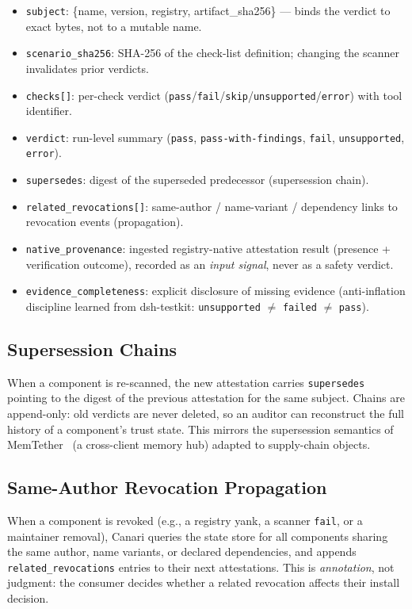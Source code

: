 \documentclass[11pt,a4paper]{article}
\begin{document}
\begin{itemize}[leftmargin=1.5em]
\item \texttt{subject}: \{name, version, registry, artifact\_sha256\} --- binds the
verdict to exact bytes, not to a mutable name.
\item \texttt{scenario\_sha256}: SHA-256 of the check-list definition; changing
the scanner invalidates prior verdicts.
\item \texttt{checks[]}: per-check verdict (\texttt{pass}/\texttt{fail}/\texttt{skip}/\texttt{unsupported}/\texttt{error}) with tool identifier.
\item \texttt{verdict}: run-level summary (\texttt{pass},
\texttt{pass-with-findings}, \texttt{fail}, \texttt{unsupported}, \texttt{error}).
\item \texttt{supersedes}: digest of the superseded predecessor (supersession chain).
\item \texttt{related\_revocations[]}: same-author / name-variant / dependency
links to revocation events (propagation).
\item \texttt{native\_provenance}: ingested registry-native attestation result
(presence + verification outcome), recorded as an \emph{input signal}, never
as a safety verdict.
\item \texttt{evidence\_completeness}: explicit disclosure of missing evidence
(anti-inflation discipline learned from dsh-testkit: \texttt{unsupported}
$\neq$ \texttt{failed} $\neq$ \texttt{pass}).
\end{itemize}

\subsection{Supersession Chains}

When a component is re-scanned, the new attestation carries \texttt{supersedes}
pointing to the digest of the previous attestation for the same subject. Chains
are append-only: old verdicts are never deleted, so an auditor can reconstruct
the full history of a component's trust state. This mirrors the supersession
semantics of MemTether~\cite{memtether} (a cross-client memory hub) adapted to
supply-chain objects.

\subsection{Same-Author Revocation Propagation}

When a component is revoked (e.g., a registry yank, a scanner \texttt{fail},
or a maintainer removal), Canari queries the state store for all components
sharing the same author, name variants, or declared dependencies, and appends
\texttt{related\_revocations} entries to their next attestations. This is
\emph{annotation}, not judgment: the consumer decides whether a related
revocation affects their install decision.
\end{document}
